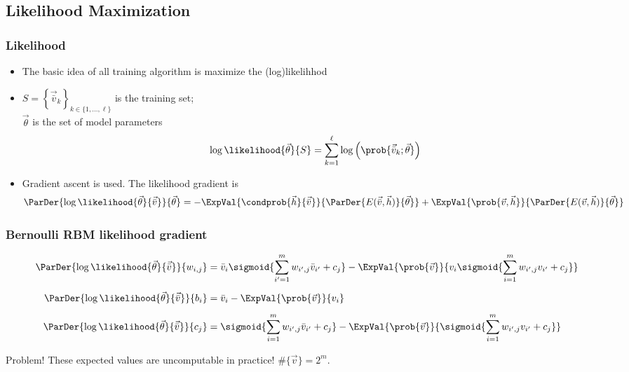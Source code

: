 
\subsection{Likelihood Maximization}
\begin{frame}
\frametitle{Likelihood}
  \begin{itemize}
		\item The basic idea of all training algorithm is \alert{maximize the (log)likelihhod}
		\item \(S = \left\{\vec{\bar{v}}_k\right\}_{k \in \{1,\dots,\ell\}}\) is the training set;\\
      \(\vec{\theta}\) is the set of model parameters
		  \[
			 \log\likelihood{\vec{\theta}}{S} = \sum_{k=1}^\ell \log\left(\prob{\vec{\bar{v}}_k;\vec{\theta}}\right)
		  \]
    \item \alert{Gradient ascent} is used. The likelihood gradient is
      \[
         \ParDer{\log\likelihood{\vec{\theta}}{\vec{\bar{v}}}}{\vec{\theta}} =
          -\ExpVal{\condprob{\vec{h}}{\vec{\bar{v}}}}{\ParDer{E(\vec{\bar{v}},\vec{h})}{\vec{\theta}}}
          +\ExpVal{\prob{\vec{v},\vec{h}}}{\ParDer{E(\vec{v},\vec{h})}{\vec{\theta}}}
      \]
	\end{itemize}
\end{frame}

\begin{frame}
  \frametitle{Bernoulli RBM likelihood gradient}
  \begin{align*}
    \ParDer{\log\likelihood{\vec{\theta}}{\vec{\bar{v}}}}{w_{i,j}}
    &= \bar{v}_i \sigmoid{\sum_{i'=1}^m w_{i',j}\bar{v}_{i'}+c_j}
    -\ExpVal{\prob{\vec{v}}}{v_i \sigmoid{\sum_{i=1}^m w_{i',j}v_{i'}+c_j}} \\[5pt]
    \ParDer{\log\likelihood{\vec{\theta}}{\vec{\bar{v}}}}{b_i}
    &= \bar{v}_i -\ExpVal{\prob{\vec{v}}}{v_i} \\[5pt]
    \ParDer{\log\likelihood{\vec{\theta}}{\vec{\bar{v}}}}{c_j}
    &= \sigmoid{\sum_{i=1}^m w_{i',j}\bar{v}_{i'}+c_j}
    -\ExpVal{\prob{\vec{v}}}{\sigmoid{\sum_{i=1}^m w_{i',j}v_{i'}+c_j}}
  \end{align*}
  \begin{alertblock}{Problem!}
    These expected values are uncomputable in practice! \(\#\{\vec{v}\} = 2^m\).
  \end{alertblock}
\end{frame}



